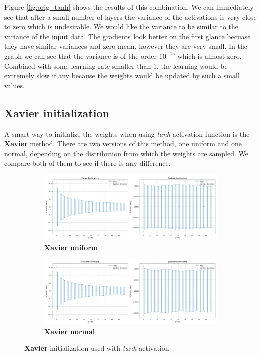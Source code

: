 \documentclass[a4paper,11pt]{article}
\begin{document}
Figure \ref{fig:orig_tanh} shows the results of this combination.
We can immediately see that after a small number of layers the variance of the activations is very close to zero which is undesirable.
We would like the variance to be similar to the variance of the input data.
The gradients look better on the first glance becuase they have similar variances and zero mean, however they are very small.
In the graph we can see that the variance is of the order $10^{-15}$ which is almost zero.
Combined with some learning rate smaller than $1$, the learning would be extremely slow if any because the weights would be updated by such a small values.

\subsection{Xavier initialization}
A smart way to initialize the weights when using \textit{tanh} activation function is the \textbf{Xavier} method.
There are two versions of this method, one uniform and one normal, depending on the distribution from which the weights are sampled.
We compare both of them to see if there is any difference.

\begin{figure}[ht]
    \centering
    \begin{subfigure}[b]{0.95\textwidth}
        \includegraphics[width=\textwidth]{../out/01_deep/tanh_xavier_uniform.png}
        \caption{\textbf{Xavier uniform}}
    \end{subfigure}
    \begin{subfigure}[b]{0.95\textwidth}
        \includegraphics[width=\textwidth]{../out/01_deep/tanh_xavier_normal.png}
        \caption{\textbf{Xavier normal}}
    \end{subfigure}
    \caption{\textbf{Xavier} initialization used with \textit{tanh} activation}
    \label{fig:xavier_tanh}
\end{figure}
\end{document}
